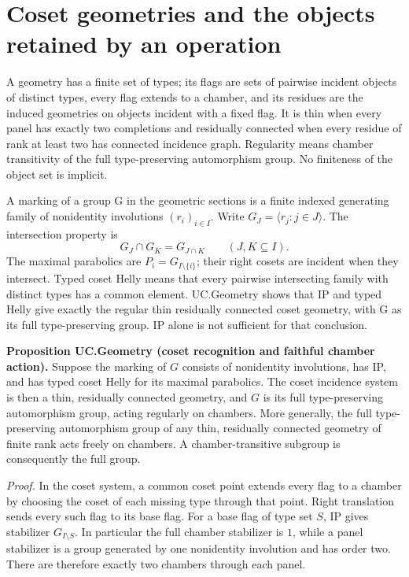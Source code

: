 \section{Coset geometries and the objects retained by an
operation}\label{coset-geometries-and-the-objects-retained-by-an-operation}

A geometry has a finite set of types; its flags are sets of pairwise
incident objects of distinct types, every flag extends to a chamber, and
its residues are the induced geometries on objects incident with a fixed
flag. It is thin when every panel has exactly two completions and
residually connected when every residue of rank at least two has
connected incidence graph. Regularity means chamber transitivity of the
full type-preserving automorphism group. No finiteness of the object set
is implicit.

A marking of a group G in the geometric sections is a finite indexed generating family of nonidentity
involutions \((r_i)_{i\in I}\). Write \(G_J=\langle r_j:j\in J\rangle\).
The intersection property is \[
G_J\cap G_K=G_{J\cap K}\qquad(J,K\subseteq I).
\tag{C1}
\] The maximal parabolics are \(P_i=G_{I\setminus\{i\}}\); their right
cosets are incident when they intersect. Typed coset Helly means that
every pairwise intersecting family with distinct types has a common
element. UC.Geometry shows that IP and typed Helly give exactly the
regular thin residually connected coset geometry, with G as its full
type-preserving group. IP alone is not sufficient for that conclusion.

\textbf{Proposition UC.Geometry (coset recognition and faithful chamber
action).} Suppose the marking of \(G\) consists of nonidentity
involutions, has IP, and has typed coset Helly for its maximal
parabolics. The coset incidence system is then a thin, residually
connected geometry, and \(G\) is its full type-preserving automorphism
group, acting regularly on chambers. More generally, the full
type-preserving automorphism group of any thin, residually connected
geometry of finite rank acts freely on chambers. A chamber-transitive
subgroup is consequently the full group.

\emph{Proof.} In the coset system, a common coset point extends every
flag to a chamber by choosing the coset of each missing type through
that point. Right translation sends every such flag to its base flag.
For a base flag of type set \(S\), IP gives stabilizer
\(G_{I\setminus S}\). In particular the full chamber stabilizer is
\(1\), while a panel stabilizer is a group generated by one nonidentity
involution and has order two. There are therefore exactly two chambers
through each panel.

